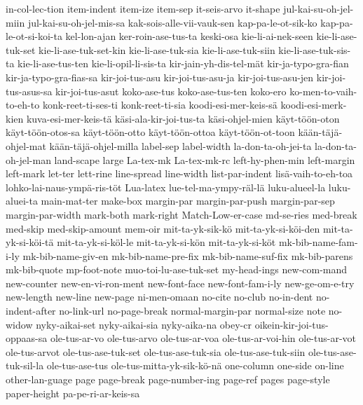 {  in-col-lec-tion
  item-indent
  item-ize
  item-sep
  it-seis-arvo
  it-shape
  jul-kai-su-oh-jel-miin
  jul-kai-su-oh-jel-mis-sa
  kak-sois-alle-vii-vauk-sen
  kap-pa-le-ot-sik-ko
  kap-pa-le-ot-si-koi-ta
  kel-lon-ajan
  ker-roin-ase-tus-ta
  keski-osa
  kie-li-ai-nek-seen
  kie-li-ase-tuk-set
  kie-li-ase-tuk-set-kin
  kie-li-ase-tuk-sia
  kie-li-ase-tuk-siin
  kie-li-ase-tuk-sis-ta
  kie-li-ase-tus-ten
  kie-li-opil-li-sis-ta
  kir-jain-yh-dis-tel-mät
  kir-ja-typo-gra-fian
  kir-ja-typo-gra-fias-sa
  kir-joi-tus-asu
  kir-joi-tus-asu-ja
  kir-joi-tus-asu-jen
  kir-joi-tus-asus-sa
  kir-joi-tus-asut
  koko-ase-tus
  koko-ase-tus-ten
  koko-ero
  ko-men-to-vaih-to-eh-to
  konk-reet-ti-ses-ti
  konk-reet-ti-sia
  koodi-esi-mer-keis-sä
  koodi-esi-merk-kien
  kuva-esi-mer-keis-tä
  käsi-ala-kir-joi-tus-ta
  käsi-ohjel-mien
  käyt-töön-oton
  käyt-töön-otos-sa
  käyt-töön-otto
  käyt-töön-ottoa
  käyt-töön-ot-toon
  kään-täjä-ohjel-mat
  kään-täjä-ohjel-milla
  label-sep
  label-width
  la-don-ta-oh-jei-ta
  la-don-ta-oh-jel-man
  land-scape
  large
  La-tex-mk
  La-tex-mk-rc
  left-hy-phen-min
  left-margin
  left-mark
  let-ter
  lett-rine
  line-spread
  line-width
  list-par-indent
  lisä-vaih-to-eh-toa
  lohko-lai-naus-ympä-ris-töt
  Lua-latex
  lue-tel-ma-ympy-räl-lä
  luku-alueel-la
  luku-aluei-ta
  main-mat-ter
  make-box
  margin-par
  margin-par-push
  margin-par-sep
  margin-par-width
  mark-both
  mark-right
  Match-Low-er-case
  md-se-ries
  med-break
  med-skip
  med-skip-amount
  mem-oir
  mit-ta-yk-sik-kö
  mit-ta-yk-si-köi-den
  mit-ta-yk-si-köi-tä
  mit-ta-yk-si-köl-le
  mit-ta-yk-si-kön
  mit-ta-yk-si-köt
  mk-bib-name-fam-i-ly
  mk-bib-name-giv-en
  mk-bib-name-pre-fix
  mk-bib-name-suf-fix
  mk-bib-parens
  mk-bib-quote
  mp-foot-note
  muo-toi-lu-ase-tuk-set
  my-head-ings
  new-com-mand
  new-counter
  new-en-vi-ron-ment
  new-font-face
  new-font-fam-i-ly
  new-ge-om-e-try
  new-length
  new-line
  new-page
  ni-men-omaan
  no-cite
  no-club
  no-in-dent
  no-indent-after
  no-link-url
  no-page-break
  normal-margin-par
  normal-size
  note
  no-widow
  nyky-aikai-set
  nyky-aikai-sia
  nyky-aika-na
  obey-cr
  oikein-kir-joi-tus-oppaas-sa
  ole-tus-ar-vo
  ole-tus-arvo
  ole-tus-ar-voa
  ole-tus-ar-voi-hin
  ole-tus-ar-vot
  ole-tus-arvot
  ole-tus-ase-tuk-set
  ole-tus-ase-tuk-sia
  ole-tus-ase-tuk-siin
  ole-tus-ase-tuk-sil-la
  ole-tus-ase-tus
  ole-tus-mitta-yk-sik-kö-nä
  one-column
  one-side
  on-line
  other-lan-guage
  page
  page-break
  page-number-ing
  page-ref
  pages
  page-style
  paper-height
  pa-pe-ri-ar-keis-sa
}
